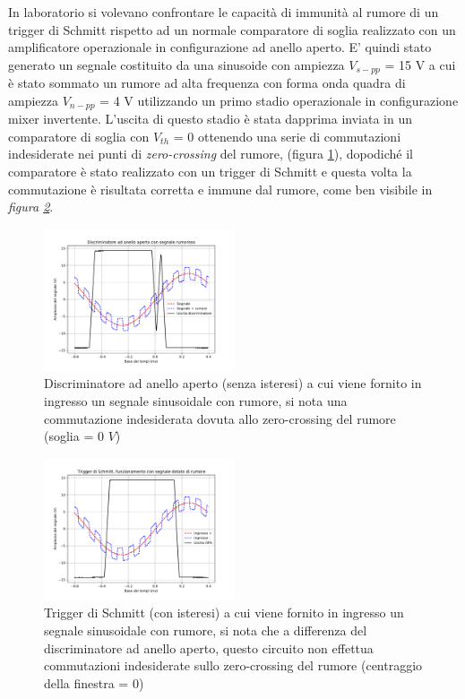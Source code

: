 \documentclass[journal]{IEEEtran}
\begin{document}
In laboratorio si volevano confrontare le capacità di immunità al rumore di un trigger di Schmitt rispetto ad un normale comparatore di soglia realizzato con un amplificatore operazionale in configurazione ad anello aperto. E' quindi stato generato un segnale costituito da una sinusoide con ampiezza $V_{s-pp}$ = 15 V a cui è stato sommato un rumore ad alta frequenza con forma onda quadra di ampiezza $V_{n-pp}$ = 4 V utilizzando un primo stadio operazionale in configurazione mixer invertente. L'uscita di questo stadio è stata dapprima inviata in un comparatore di soglia con $V_{th}$ = 0 ottenendo una serie di commutazioni indesiderate nei punti di \textit{zero-crossing} del rumore, (figura \ref{fig:trigger-noisy}), dopodiché il comparatore è stato realizzato con un trigger di Schmitt e questa volta la commutazione è risultata corretta e immune dal rumore, come ben visibile in \textit{figura \ref{fig:trigger-ok}}.
\begin{figure}[H]%
\begin {center}
\includegraphics[width=0.50\textwidth]{analysis/output/noisy-open-ring.pdf}
\caption{Discriminatore ad anello aperto (senza isteresi) a cui viene fornito in ingresso un segnale sinusoidale con rumore, si nota una commutazione indesiderata dovuta allo zero-crossing del rumore (soglia = 0 $V$)}
\label{fig:trigger-noisy}
\end {center}
\end{figure}

\begin{figure}[H]%
\begin {center}
\includegraphics[width=0.50\textwidth]{analysis/output/trigger2.pdf}
\caption{Trigger di Schmitt (con isteresi) a cui viene fornito in ingresso un segnale sinusoidale con rumore, si nota che a differenza del discriminatore ad anello aperto, questo circuito non effettua commutazioni indesiderate sullo zero-crossing del rumore (centraggio della finestra = 0)}
\label{fig:trigger-ok}
\end {center}
\end{figure}
\end{document}
